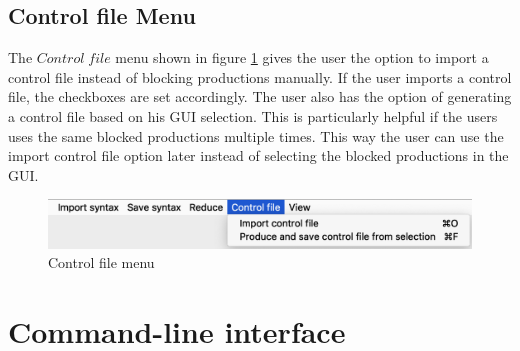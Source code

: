 \subsection{Control file Menu}\label{sec:ConceptGUIControlFileMenu}

The $Control\;file$ menu shown in figure \ref{fig:ControlFileMenu} gives the user the option to import a control file instead of blocking productions manually. If the user imports a control file, the checkboxes are set accordingly.
The user also has the option of generating a control file based on his GUI selection. This is particularly helpful if the users uses the same blocked productions multiple times. This way the user can use the import control file option later instead of selecting the blocked productions in the GUI.

\begin{figure}[H]
\centering
\includegraphics[width=.7\textwidth]{images/control_file_menu.png}
\caption{Control file menu}
\label{fig:ControlFileMenu}
\end{figure}

\section{Command-line interface}\label{sec:ConceptCommandLineInterface}

